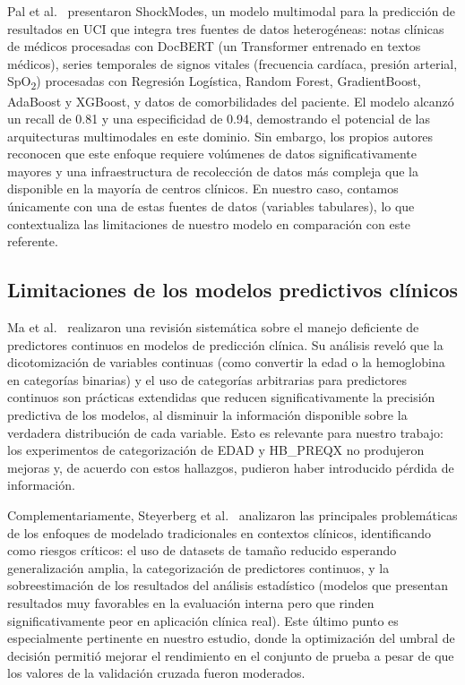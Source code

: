 Pal et al.\ \cite{pal2022} presentaron ShockModes, un modelo multimodal para la predicción de resultados en UCI que integra tres fuentes de datos heterogéneas: notas clínicas de médicos procesadas con DocBERT (un Transformer entrenado en textos médicos), series temporales de signos vitales (frecuencia cardíaca, presión arterial, SpO\textsubscript{2}) procesadas con Regresión Logística, Random Forest, GradientBoost, AdaBoost y XGBoost, y datos de comorbilidades del paciente. El modelo alcanzó un recall de 0.81 y una especificidad de 0.94, demostrando el potencial de las arquitecturas multimodales en este dominio. Sin embargo, los propios autores reconocen que este enfoque requiere volúmenes de datos significativamente mayores y una infraestructura de recolección de datos más compleja que la disponible en la mayoría de centros clínicos. En nuestro caso, contamos únicamente con una de estas fuentes de datos (variables tabulares), lo que contextualiza las limitaciones de nuestro modelo en comparación con este referente.

\subsection{Limitaciones de los modelos predictivos clínicos}

Ma et al.\ \cite{ma2023} realizaron una revisión sistemática sobre el manejo deficiente de predictores continuos en modelos de predicción clínica. Su análisis reveló que la dicotomización de variables continuas (como convertir la edad o la hemoglobina en categorías binarias) y el uso de categorías arbitrarias para predictores continuos son prácticas extendidas que reducen significativamente la precisión predictiva de los modelos, al disminuir la información disponible sobre la verdadera distribución de cada variable. Esto es relevante para nuestro trabajo: los experimentos de categorización de EDAD y HB\_PREQX no produjeron mejoras y, de acuerdo con estos hallazgos, pudieron haber introducido pérdida de información.

Complementariamente, Steyerberg et al.\ \cite{steyerberg2018} analizaron las principales problemáticas de los enfoques de modelado tradicionales en contextos clínicos, identificando como riesgos críticos: el uso de datasets de tamaño reducido esperando generalización amplia, la categorización de predictores continuos, y la sobreestimación de los resultados del análisis estadístico (modelos que presentan resultados muy favorables en la evaluación interna pero que rinden significativamente peor en aplicación clínica real). Este último punto es especialmente pertinente en nuestro estudio, donde la optimización del umbral de decisión permitió mejorar el rendimiento en el conjunto de prueba a pesar de que los valores de la validación cruzada fueron moderados.

